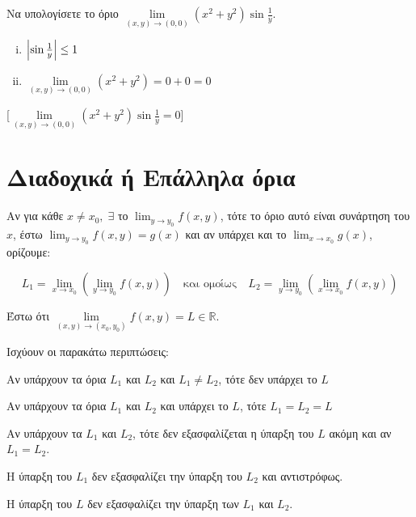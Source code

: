 \begin{example}
    Να υπολογίσετε το όριο $ \lim\limits_{(x,y)\to (0, 0)} (x^{2}+y^{2}) 
    \sin{\frac{1}{y}} $.  

    \begin{solution}
    \item {}
        \begin{minipage}{0.4\textwidth}
            \begin{enumerate}[i)]
                \item $ \abs{\sin{\frac{1}{y}}} \leq 1 $ \hfill {}
                \item $ \lim\limits_{(x,y)\to (0, 0)} (x^{2}+y^{2}) = 0+0=0 $ 
                    \hfill {}
            \end{enumerate}
        \end{minipage}
        [$ \lim\limits_{(x,y)\to (0, 0)} (x^{2}+y^{2}) \sin{\frac{1}{y}} 
        = 0$]
    \end{solution}
\end{example}


\section{Διαδοχικά ή Επάλληλα όρια}

Αν για κάθε $ x \neq x_{0}, \; \exists $ το $ \lim_{y \to y_{0}} f(x,y) $, τότε το όριο 
αυτό είναι συνάρτηση του $x$, έστω $ \lim_{y \to y_{0}} f(x,y) = g(x) $ και 
αν υπάρχει και το $ \lim_{x \to x_{0}} g(x) $, ορίζουμε: 

\[
    L_{1} = \lim_{x \to x_{0}} \left(\lim_{y \to y_{0}} f(x,y)\right) 
    \quad \text{και ομοίως} \quad
    L_{2} = \lim_{y \to y_{0}} \left(\lim_{x \to x_{0}} f(x,y)\right) 
 \] 

Έστω ότι $ \lim\limits_{(x,y)\to (x_{0}, y_{0})} f(x,y) = L \in \mathbb{R} $.

Ισχύουν οι παρακάτω περιπτώσεις:
\begin{myitemize}
\item Αν υπάρχουν τα όρια $ L_{1} $ και $ L_{2} $ και $ L_{1} \neq L_{2} $, τότε
    δεν υπάρχει το $ L $
\item Αν υπάρχουν τα όρια $ L_{1} $ και $ L_{2} $ και υπάρχει το $ L $, τότε
    $ L_{1}=L_{2}=L $
\item Αν υπάρχουν τα $ L_{1} $ και $ L_{2} $, τότε δεν εξασφαλίζεται η ύπαρξη του 
    $ L $ ακόμη και αν $ L_{1}=L_{2} $.
\item Η ύπαρξη του $ L_{1} $ δεν εξασφαλίζει την ύπαρξη του $ L_{2} $ και αντιστρόφως.
\item Η ύπαρξη του $ L $ δεν εξασφαλίζει την ύπαρξη των $ L_{1} $ και $ L_{2} $.
\end{myitemize}

